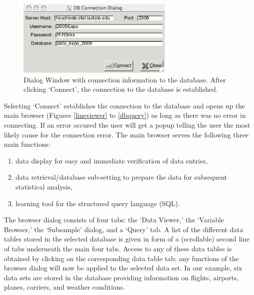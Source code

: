 \documentclass[11pt]{tise_style}
\begin{document}
\begin{figure}[htbp] %
   \centering
   \includegraphics[width=3in]{dbconnect-dialog.png} 
   \caption{Dialog Window with connection information to the database. After clicking `Connect', the connection to the database is established.}
   \label{dbconnect}
\end{figure}



Selecting `Connect' establishes the connection to the database and opens up the main browser (Figures \ref{lineviewer} to \ref{dbquery}) as long as there was no error in connecting.  If an error occured the user will get a popup telling the user the most likely cause for the connection error.  The main browser serves the following three main functions:
\begin{enumerate}
\item data display for easy and immediate verification of data entries, 
\item data retrieval/database sub-setting to prepare the data for subsequent statistical analysis, 
\item learning tool for the structured query language (SQL).
\end{enumerate}

The browser dialog consists of four tabs: the `Data Viewer,' the `Variable Browser,' the `Subsample' dialog, and a `Query' tab.  A list of the different data tables stored in the selected database is given in form of a (scrollable) second line of tabs underneath the main four tabs. Access to any of these data tables is obtained  by clicking on the corresponding data table tab; any functions of the browser dialog will now be applied to the selected data set. In our example, six data sets are stored in the database  providing information on flights, airports, planes, carriers, and weather conditions. 
\end{document}
